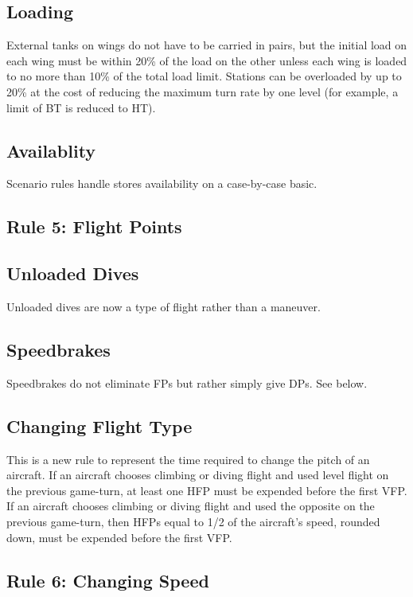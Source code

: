 \documentclass[10pt]{article}
\begin{document}
\subsection{Loading} External tanks on wings do not have to be carried in pairs, but the initial load on each wing must be within 20\% of the load on the other unless each wing is loaded to no more than 10\% of the total load limit. Stations can be overloaded by up to 20\% at the cost of reducing the maximum turn rate by one level (for example, a limit of BT is reduced to HT).

\subsection{Availablity} Scenario rules handle stores availability on a case-by-case basic.

\subsection{Rule 5: Flight Points}

\subsection{Unloaded Dives} Unloaded dives are now a type of flight rather than a maneuver.

\subsection{Speedbrakes} Speedbrakes do not eliminate FPs but rather simply give DPs. See below.

\subsection{Changing Flight Type} This is a new rule to represent the time required to change the pitch of an aircraft. If an aircraft chooses climbing or diving flight and used level flight on the previous game-turn, at least one HFP must be expended before the first VFP. If an aircraft chooses climbing or diving flight and used the opposite on the previous game-turn, then HFPs equal to 1/2 of the aircraft's speed, rounded down, must be expended before the first VFP. 

\subsection{Rule 6: Changing Speed}
\end{document}
